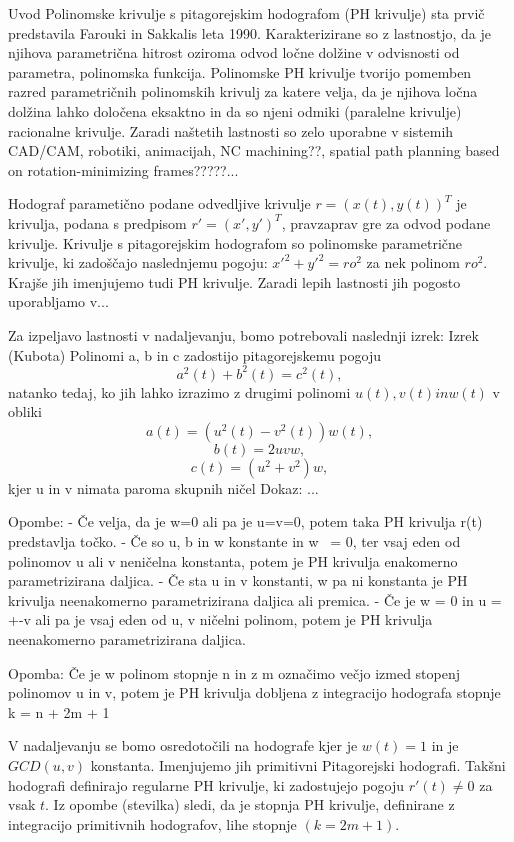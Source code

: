 \documentclass[12pt]{article}
\begin{document}
Uvod
Polinomske krivulje s pitagorejskim hodografom (PH krivulje) sta prvič predstavila Farouki in Sakkalis leta 1990.
Karakterizirane so z lastnostjo, da je njihova parametrična hitrost oziroma odvod ločne dolžine v odvisnosti od parametra,
polinomska funkcija. Polinomske PH krivulje tvorijo pomemben razred parametričnih polinomskih krivulj
za katere velja, da je njihova ločna dolžina lahko določena eksaktno in da so njeni odmiki (paralelne krivulje) racionalne krivulje.
Zaradi naštetih lastnosti so zelo uporabne v sistemih CAD/CAM, robotiki, animacijah, NC machining??, spatial path planning based on rotation-minimizing frames?????...

Hodograf parametično podane odvedljive krivulje $r = (x(t), y(t))^T$ je krivulja, 
podana s predpisom $r' = (x', y')^T$, pravzaprav gre za odvod podane krivulje. 
Krivulje s pitagorejskim hodografom so polinomske parametrične krivulje, 
ki zadoščajo naslednjemu pogoju:
$x'^2 + y'^2 = ro^2$ za nek polinom $ro^2$.
Krajše jih imenjujemo tudi PH krivulje. 
Zaradi lepih lastnosti jih pogosto uporabljamo v...

Za izpeljavo lastnosti v nadaljevanju, bomo potrebovali naslednji izrek:
Izrek (Kubota)
Polinomi a, b in c zadostijo pitagorejskemu pogoju
$$a^2(t) + b^2(t) = c^2(t),$$
natanko tedaj, ko jih lahko izrazimo z drugimi polinomi $u(t), v(t) in w(t)$ v obliki
$$a(t) = (u^2(t) - v^2(t))w(t),$$
$$b(t) = 2uvw,$$
$$c(t) = (u^2 + v^2)w,$$
kjer u in v nimata paroma skupnih ničel
Dokaz: ...

Opombe:
- Če velja, da je w=0 ali pa je u=v=0, potem taka PH krivulja r(t) predstavlja točko.
- Če so u, b in w konstante in w ~= 0, ter vsaj eden od polinomov u ali v neničelna konstanta,
potem je PH krivulja enakomerno parametrizirana daljica.
- Če sta u in v konstanti, w pa ni konstanta je PH krivulja neenakomerno parametrizirana daljica ali premica.
- Če je w = 0 in u = +-v ali pa je vsaj eden od u, v ničelni polinom, 
potem je PH krivulja neenakomerno parametrizirana daljica. 

Opomba:
Če je w polinom stopnje n in z m označimo večjo izmed stopenj polinomov u in v, 
potem je PH krivulja dobljena z integracijo hodografa stopnje k = n + 2m + 1

V nadaljevanju se bomo osredotočili na hodografe kjer je $w(t) = 1$ in je $GCD(u,v)$ konstanta.
Imenjujemo jih primitivni Pitagorejski hodografi. 
Takšni hodografi definirajo regularne PH krivulje, ki zadostujejo pogoju $r'(t) \neq 0$ za vsak $t$. 
Iz opombe (stevilka) sledi, da je stopnja PH krivulje, definirane z integracijo
primitivnih hodografov, lihe stopnje $(k = 2m + 1)$.
\end{document}
